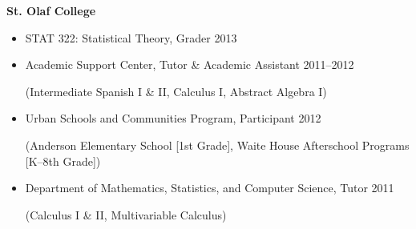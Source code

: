 \documentclass[margin]{res}
\begin{document}
\begin{resume}
\textbf{St. Olaf College}
\begin{itemize}
\item STAT 322: Statistical Theory, Grader \hfill 2013 
\item Academic Support Center, Tutor \& Academic Assistant \hfill 2011--2012 \\
\begin{footnotesize}(Intermediate Spanish I \& II, Calculus I, Abstract Algebra I)\end{footnotesize}
\item Urban Schools and Communities Program, Participant \hfill 2012 \\
\begin{footnotesize}(Anderson Elementary School [1st Grade], Waite House Afterschool Programs [K--8th Grade]) \end{footnotesize} 
\item Department of Mathematics, Statistics, and Computer Science, Tutor  \hfill 2011 \\
\begin{footnotesize}(Calculus I \& II, Multivariable Calculus) \end{footnotesize} \\ 
\end{itemize}


\end{resume}
\end{document}
